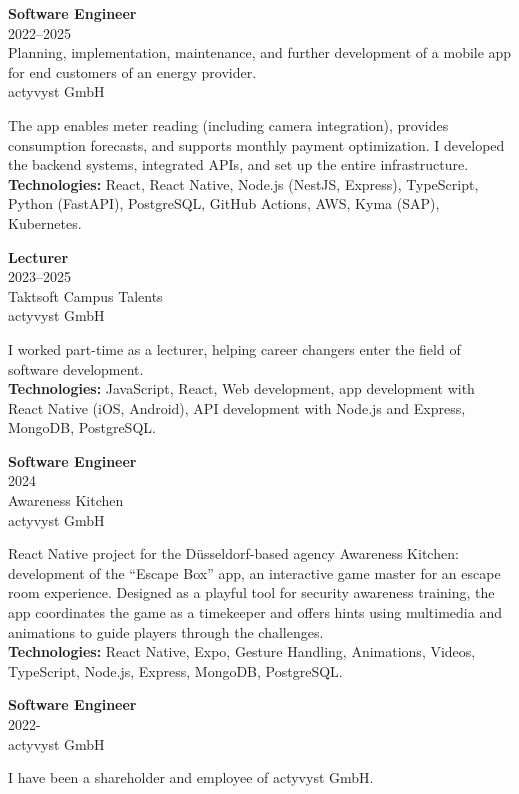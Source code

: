 \documentclass[a4paper,10pt]{article}
\newcommand{\experienceimg}[7]{
  \begin{adjustbox}{}
    \begin{minipage}[t]{0.25\textwidth}
      \textbf{\color{sectionblue}#1} \\
      {\color{sectiongray}#2} \\
      #3\\
      {\color{sectiongray}#4}
    \end{minipage}
    \hspace{1em}
    \begin{minipage}[t]{0.75\textwidth}
      #5\\
      \adjustbox{margin=0.5cm}{\texttt{[image: \#6]}}
      \textbf{Technologies:} #7
    \end{minipage}
  \end{adjustbox}
}
\newcommand{\experience}[4]{
  \begin{adjustbox}{}
    \begin{minipage}[t]{0.25\textwidth}
      \textbf{\color{sectionblue}#1} \\
      {\color{sectiongray}#2} \\
      #3\\
    \end{minipage}
    \hspace{1em}
    \begin{minipage}[t]{0.75\textwidth}
      #4\\
    \end{minipage}
  \end{adjustbox}
}
\begin{document}
  \experienceimg
    {Software Engineer}
    {2022–2025}
    {Planning, implementation, maintenance, and further development of a mobile app for end customers of an energy provider.}
    {actyvyst GmbH}
    {The app enables meter reading (including camera integration), provides consumption forecasts, and supports monthly payment optimization. I developed the backend systems, integrated APIs, and set up the entire infrastructure.}
    {assets/badenova.png}
    {React, React Native, Node.js (NestJS, Express), TypeScript, Python (FastAPI), PostgreSQL, GitHub Actions, AWS, Kyma (SAP), Kubernetes.}

  \vspace{1em}{\color{sectionblue}\rule{\textwidth}{0.4pt}}\vspace{1em}

  \experienceimg
  {Lecturer}
  {2023–2025}
  {Taktsoft Campus Talents}
  {actyvyst GmbH}
  {I worked part-time as a lecturer, helping career changers enter the field of software development. }
  {assets/logo-campus-talents.png}
  {JavaScript, React, Web development, app development with React Native (iOS, Android), API development with Node.js and Express, MongoDB, PostgreSQL.}

  \vspace{1em}{\color{sectionblue}\rule{\textwidth}{0.4pt}}\vspace{1em}

  \experienceimg
  {Software Engineer}
  {2024}
  {Awareness Kitchen}
  {actyvyst GmbH}
  {React Native project for the Düsseldorf-based agency Awareness Kitchen: development of the “Escape Box” app, an interactive game master for an escape room experience. Designed as a playful tool for security awareness training, the app coordinates the game as a timekeeper and offers hints using multimedia and animations to guide players through the challenges.}
  {assets/awareness-kitchen.png}
  {React Native, Expo, Gesture Handling, Animations, Videos, TypeScript, Node.js, Express, MongoDB, PostgreSQL.}

  \vspace{1em}{\color{sectionblue}\rule{\textwidth}{0.4pt}}\vspace{1em}

  \experience
  {Software Engineer}
  {2022-}
  {actyvyst GmbH}
  {I have been a shareholder and employee of actyvyst GmbH.}

  \vspace{1em}{\color{sectionblue}\rule{\textwidth}{0.4pt}}\vspace{1em}
\end{document}
